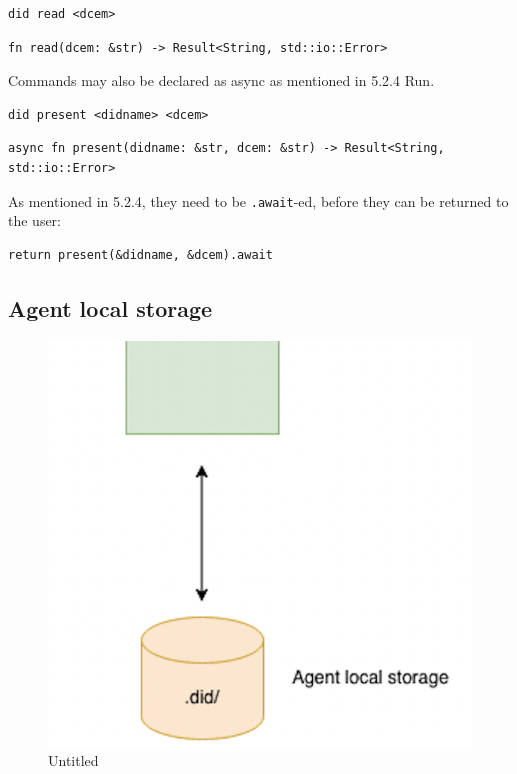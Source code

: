 \begin{lstlisting}
did read <dcem>
\end{lstlisting}

\begin{lstlisting}
fn read(dcem: &str) -> Result<String, std::io::Error>
\end{lstlisting}

Commands may also be declared as async as mentioned in 5.2.4 Run.

\begin{lstlisting}
did present <didname> <dcem>
\end{lstlisting}

\begin{lstlisting}
async fn present(didname: &str, dcem: &str) -> Result<String, std::io::Error>
\end{lstlisting}

As mentioned in 5.2.4, they need to be
\passthrough{\lstinline!.await!}-ed, before they can be returned to the
user:

\begin{lstlisting}
return present(&didname, &dcem).await
\end{lstlisting}

\hypertarget{agent-local-storage}{%
\subsection{Agent local storage}\label{agent-local-storage}}

\begin{figure}
\centering
\includegraphics{Architecture 1442df162dbe45f4a423ba37d3e12363/Untitled 5.png}
\caption{Untitled}
\end{figure}

